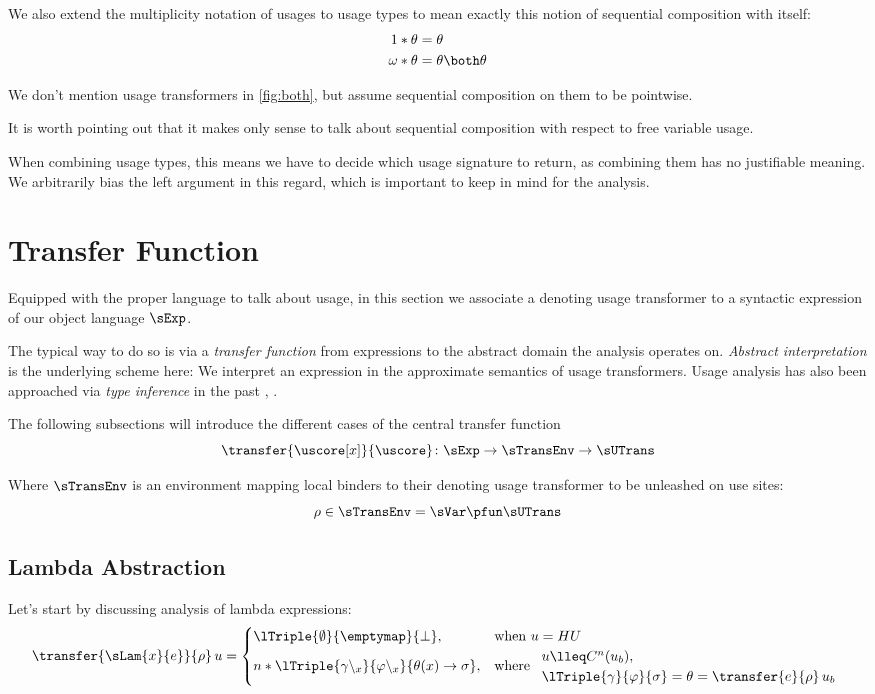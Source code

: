 We also extend the multiplicity notation of usages to usage types to mean exactly this notion of sequential composition with itself:
\begin{alignat*}{1}
  1 * \theta &= \theta \\
  \omega * \theta &= \theta \both \theta
\end{alignat*}

We don't mention usage transformers in \cref{fig:both}, but assume sequential composition on them to be pointwise.

It is worth pointing out that it makes only sense to talk about sequential composition with respect to free variable usage. 

When combining usage types, this means we have to decide which usage signature to return, as combining them has no justifiable meaning. 
We arbitrarily bias the left argument in this regard, which is important to keep in mind for the analysis.

\section{Transfer Function}\label{sec:transfer}

Equipped with the proper language to talk about usage, in this section we associate a denoting usage transformer to a syntactic expression of our object language $\sExp$.

The typical way to do so is via a \emph{transfer function} from expressions to the abstract domain the analysis operates on.
\emph{Abstract interpretation} is the underlying scheme here: We interpret an expression in the approximate semantics of usage transformers.
Usage analysis has also been approached via \emph{type inference} in the past \parencite{warnsbrough}, \parencite{verstoep}.

The following subsections will introduce the different cases of the central transfer function
\[
\transfer{\uscore[x]}{\uscore} \colon \sExp \to \sTransEnv \to \sUTrans
\]

Where $\sTransEnv$ is an environment mapping local  binders to their denoting usage transformer to be unleashed on use sites:
\[
\rho \in \sTransEnv = \sVar \pfun \sUTrans
\]

\subsection{Lambda Abstraction}

Let's start by discussing analysis of lambda expressions:
\[
\transfer{\sLam{x}{e}}{\rho}\,u =
  \begin{cases}
    \lTriple{\emptyset}{\emptymap}{\bot}, & \text{when } u = HU \\
    n*\lTriple{\gamma\setminus_x}{\varphi\setminus_x}{\theta(x) \to \sigma}, & \text{where } 
      \begin{array}{l}
        u \lleq C^n(u_b), \\
        \lTriple{\gamma}{\varphi}{\sigma} = \theta = \transfer{e}{\rho}\,u_b
      \end{array}
  \end{cases}
\]

